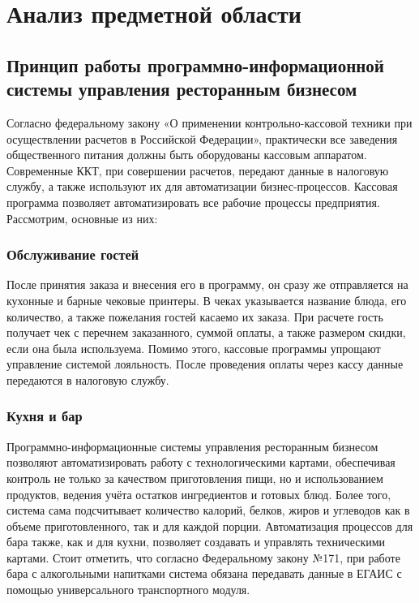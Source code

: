 \section{Анализ предметной области}
\subsection{Принцип работы программно-информационной системы управления ресторанным бизнесом}

Согласно федеральному закону «О применении контрольно-кассовой техники при осуществлении расчетов в Российской Федерации», практически все заведения общественного питания должны быть оборудованы кассовым аппаратом\cite{zakon}. Современные ККТ, при совершении расчетов, передают данные в налоговую службу, а также используют их для автоматизации бизнес-процессов. Кассовая программа позволяет автоматизировать все рабочие процессы предприятия. Рассмотрим, основные из них:

\subsubsection{Обслуживание гостей}
После принятия заказа и внесения его в программу, он сразу же отправляется на кухонные и барные чековые принтеры. В чеках указывается название блюда, его количество, а также пожелания гостей касаемо их заказа. При расчете гость получает чек с перечнем заказанного, суммой оплаты, а также размером скидки, если она была используема. Помимо этого, кассовые программы упрощают управление системой лояльность. После проведения оплаты через кассу данные передаются в налоговую службу\cite{gosty}.

\subsubsection{Кухня и бар}
Программно-информационные системы управления ресторанным бизнесом позволяют автоматизировать работу с технологическими картами, обеспечивая контроль не только за качеством приготовления пищи, но и использованием продуктов, ведения учёта остатков ингредиентов и готовых блюд\cite{statiay}. Более того, система сама подсчитывает количество калорий, белков, жиров и углеводов как в объеме приготовленного, так и для каждой порции.
Автоматизация процессов для бара также, как и для кухни, позволяет создавать и управлять техническими картами. Стоит отметить, что согласно Федеральному закону №171, при работе бара с алкогольными напитками система обязана передавать данные в ЕГАИС с помощью универсального транспортного модуля.



